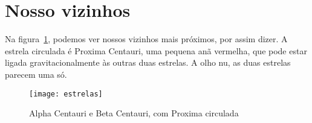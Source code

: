\documentclass[a4paper,oneside]{article}
\begin{document}
\frenchspacing

\section{Nosso vizinhos}

Na figura~\ref{fig:estrelas}, podemos ver nossos vizinhos mais próximos, por
assim dizer. A estrela circulada é Proxima Centauri, uma pequena anã vermelha,
que pode estar ligada gravitacionalmente às outras duas estrelas. A olho nu, as
duas estrelas parecem uma só.

\begin{figure}[h]
  \centering
  \texttt{[image: estrelas]}
  \caption{Alpha Centauri e Beta Centauri, com Proxima circulada}
  \label{fig:estrelas}
\end{figure}
\end{document}
